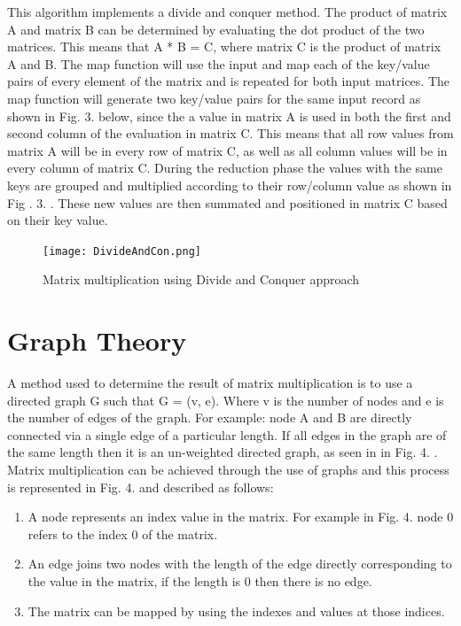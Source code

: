 \documentclass[conference]{IEEEtran}
\begin{document}
\noindent This algorithm implements a divide and conquer method. The product of matrix A and matrix B can be determined by evaluating the dot product of the two matrices. This means that A * B = C, where matrix C is the product of matrix A and B. The map function will use the input and map each of the key/value pairs of every element of the matrix and is repeated for both input matrices. The map function will generate two key/value pairs for the same input record as shown in Fig. 3. below, since the a value in matrix A is used in both the first and second column of the evaluation in matrix C. This means that all row values from matrix A will be in every row of matrix C, as well as all column values will be in every column of matrix C. During the reduction phase the values with the same keys are grouped and multiplied according to their row/column value as shown in Fig . 3. . These new values are then summated and positioned in matrix C based on their key value.\\

\noindent
\begin{figure}[H]
\centering
\texttt{[image: DivideAndCon.png]}
\caption{Matrix multiplication using Divide and Conquer approach}
\label{fig:circuit}
\end{figure}
  
 
\section{Graph Theory}

\noindent A method used to determine the result of matrix multiplication is to use a directed graph G such that G = (v, e). Where v is the number of nodes and e is the number of edges of the graph. For example: node A and B are directly connected via a single edge of a particular length. If all edges in the graph are of the same length then it is an un-weighted directed graph, as seen in in Fig. 4. . Matrix multiplication can be achieved through the use of graphs and this process is represented in Fig. 4. and described as follows:\\

\begin{enumerate}
\item A node represents an index value in the matrix. For example in Fig. 4. node 0 refers to the index 0 of the matrix.
\item An edge joins two nodes with the length of the edge directly corresponding to the value in the matrix, if the length is 0 then there is no edge.
\item The matrix can be mapped by using the indexes and values at those indices.
\end{enumerate}
\end{document}
